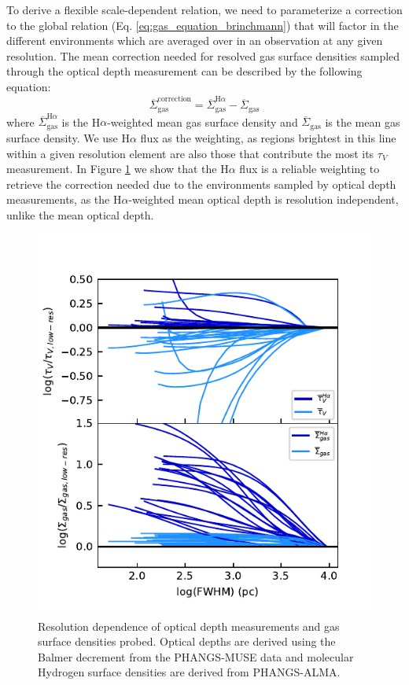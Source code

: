 \documentclass[fleqn,usenatbib]{mnras}
\begin{document}
To derive a flexible scale-dependent relation, we need to parameterize a correction to the global relation (Eq. \ref{eq:gas_equation_brinchmann}) that will factor in the different environments which are averaged over in an observation at any given resolution. The mean correction needed for resolved gas surface densities sampled through the optical depth measurement can be described by the following equation:
\begin{equation}
    \overline{\Sigma}_{\textrm{gas}}^{\textrm{correction}} = \overline{\Sigma}_{\textrm{gas}}^{\textrm{H}\alpha} - \overline{\Sigma}_{\textrm{gas}} 
    \label{eq:gas_correction}
\end{equation}
where $\overline{\Sigma}_{\textrm{gas}}^{\textrm{H}\alpha}$ is the H$\alpha$-weighted mean gas surface density and $\overline{\Sigma}_{\textrm{gas}}$ is the mean gas surface density. We use H$\alpha$ flux as the weighting, as regions brightest in this line within a given resolution element are also those that contribute the most its $\tau_V$ measurement. In Figure \ref{fig:resolution_dependence_tau_SD} we show that the H$\alpha$ flux is a reliable weighting to retrieve the correction needed due to the environments sampled by optical depth measurements, as the H$\alpha$-weighted mean optical depth is resolution independent, unlike the mean optical depth.

\begin{figure}
    \centering
    \includegraphics[width=\columnwidth]{figures/fig6.pdf}
    \caption{Resolution dependence of optical depth measurements and gas surface densities probed. Optical depths are derived using the Balmer decrement from the PHANGS-MUSE data and molecular Hydrogen surface densities are derived from PHANGS-ALMA.}
    \label{fig:resolution_dependence_tau_SD}
\end{figure}
\end{document}

